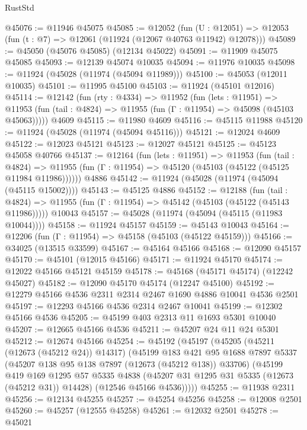 \begin{lexlean}{RustStd}
\begin{coremodule}
@45076 := @11946 @45075
@45085 := @12052
    (fun (U : @12051) => @12053 (fun (t : @7) => @12061 (@11924 (@12067 @40763 @11942) @12078)))
@45089 := @45050 (@45076 @45085) (@12134 @45022)
@45091 := @11909 @45075 @45085
@45093 := @12139 @45074 @10035
@45094 := @11976 @10035
@45098 := @11924 (@45028 (@11974 (@45094 @11989)))
@45100 := @45053 (@12011 @10035)
@45101 := @11995 @45100
@45103 := @11924 (@45101 @12016)
@45114 := @12142
    (fun (rty : @4334) =>
    @11952
      (fun (lets : @11951) =>
      @11953 (fun (tail : @4824) => @11955 (fun (Γ : @11954) => @45098 (@45103 @45063)))))
    @4609
@45115 := @11980 @4609
@45116 := @45115 @11988
@45120 := @11924 (@45028 (@11974 (@45094 @45116)))
@45121 := @12024 @4609
@45122 := @12023 @45121
@45123 := @12027 @45121
@45125 := @45123 @45058 @40766
@45137 := @12164
    (fun (lets : @11951) =>
    @11953
      (fun (tail : @4824) =>
      @11955 (fun (Γ : @11954) => @45120 (@45103 (@45122 (@45125 @11984 @11986))))))
    @4886
@45142 := @11924 (@45028 (@11974 (@45094 (@45115 @15002))))
@45143 := @45125 @4886
@45152 := @12188
    (fun (tail : @4824) => @11955 (fun (Γ : @11954) => @45142 (@45103 (@45122 (@45143 @11986)))))
    @10043
@45157 := @45028 (@11974 (@45094 (@45115 (@11983 @10044))))
@45158 := @11924 @45157
@45159 := @45143 @10043
@45164 := @12206 (fun (Γ : @11954) => @45158 (@45103 (@45122 @45159)))
@45166 := @34025 (@13515 @33599)
@45167 := @45164 @45166
@45168 := @12090 @45157
@45170 := @45101 (@12015 @45166)
@45171 := @11924 @45170
@45174 := @12022 @45166 @45121 @45159
@45178 := @45168 (@45171 @45174) (@12242 @45027)
@45182 := @12090 @45170 @45174 (@12247 @45100)
@45192 := @12279 @45166 @4536 @2311 @2314 @2467 @1690 @4886 @10041 @4536 @2501
@45197 := @12293 @45166 @4536 @2314 @2467 @10041
@45199 := @12302 @45166 @4536
@45205 := @45199 @403 @2313 @11 @1693 @5301 @10040
@45207 := @12665 @45166 @4536
@45211 := @45207 @24 @11 @24 @5301
@45212 := @12674 @45166
@45254 := @45192
    (@45197
      (@45205
        (@45211 (@12673 (@45212 @24)) @14317)
        (@45199
          @183
          @421
          @95
          @1688
          @7897
          @5337
          (@45207 @138 @95 @138 @7897 (@12673 (@45212 @138)) @33706)
          (@45199
            @419
            @169
            @1295
            @57
            @5335
            @4838
            (@45207 @31 @1295 @31 @5335 (@12673 (@45212 @31)) @14428)
            (@12546 @45166 @4536)))))
@45255 := @11938 @2311
@45256 := @12134 @45255
@45257 := @45254 @45256
@45258 := @12008 @2501
@45260 := @45257 (@12555 @45258)
@45261 := @12032 @2501
@45278 := @45021

\end{coremodule}
\end{lexlean}
